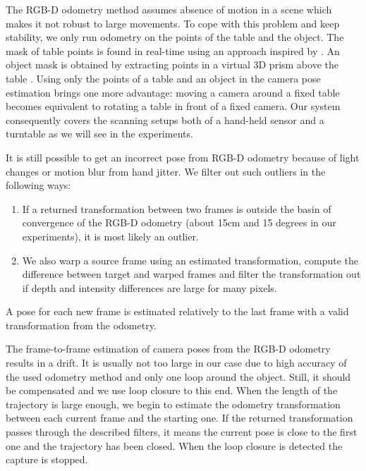 \documentclass[letterpaper, 10 pt, conference]{ieeeconf}  %
\begin{document}
The RGB-D odometry method assumes absence of motion in a scene which makes it not
robust to large movements. To cope with this problem and keep stability, we only run odometry
on the points of the table and the object. The mask of table points
is found in real-time using an approach inspired by \cite{poppinga2008fast}. An object mask is
obtained by extracting points in a virtual 3D prism above the table \cite{rusu2009detecting}.
Using only the points
of a table and an object in the camera pose estimation brings one more advantage:
moving a camera around a fixed table becomes equivalent to rotating
a table in front of a fixed camera. Our system consequently covers the scanning setups both of a hand-held sensor 
and a turntable as we will see in the experiments.

It is still possible to get an incorrect pose from RGB-D odometry
because of light changes or motion blur from hand jitter. We filter out such outliers in the following ways:

\begin{enumerate}
 \item If a returned transformation between two frames is outside the basin of convergence
 of the RGB-D odometry (about 15cm and 15 degrees in our experiments), it is most likely an outlier.
 \item We also warp a source frame using an estimated transformation,
 compute the difference between target and warped frames 
 and filter the transformation out if
 depth and intensity differences are large for many pixels.
\end{enumerate}

A pose for each new frame is estimated relatively to the last frame
with a valid transformation from the odometry.

The frame-to-frame estimation of camera poses from the RGB-D 
odometry results in a drift. It is usually not too large in our case
due to high accuracy of the used odometry method \cite{steinbrucker2011real}
and only one loop around the object.
Still, it should be compensated and we use loop closure to this end.
When the length of the trajectory is large enough, we begin to estimate the
odometry transformation between each current frame and the starting one. 
If the returned transformation passes through the described filters, 
it means the current pose is close to the first one and 
the trajectory has been closed. When the loop closure is detected 
the capture is stopped.
\end{document}
